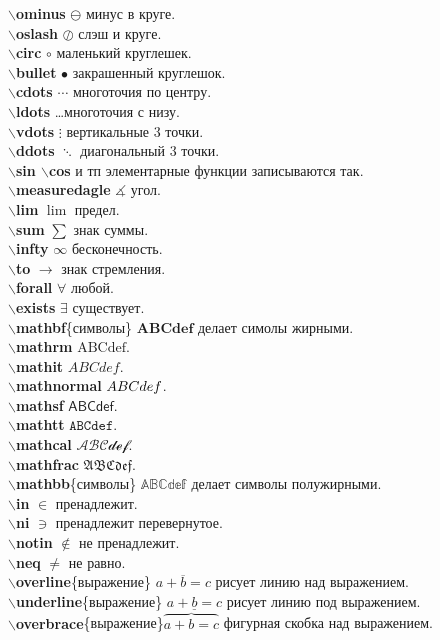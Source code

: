 \documentclass{article}
\newcommand{\bs}{$\backslash$}
\newcommand{\bd}[1]{{\bfseries #1}} %
\newcommand{\bb}[1]{\bd{\bs #1}} %
\begin{document}
\bb{ominus} $\ominus$ минус в круге.\\
\bb{oslash} $\oslash$ слэш и круге.\\
\bb{circ} $\circ$ маленький круглешек.\\
\bb{bullet} $\bullet$ закрашенный круглешок.\\
\bb{cdots} $\cdots$ многоточия по центру.\\
\bb{ldots} \ldots многоточия с низу.\\
\bb{vdots} $\vdots$ вертикальные 3 точки.\\
\bb{ddots} $\ddots$ диагональный 3 точки.\\
\bb{sin \bs cos} и тп элементарные функции записываются так.\\
\bb{measuredagle} $\measuredangle$ угол.\\
\bb{lim} $\lim$ предел.\\
\bb{sum} $\sum$ знак суммы.\\
\bb{infty} $\infty$ бесконечность.\\
\bb{to} $\to$ знак стремления.\\
\bb{forall} $\forall$ любой.\\
\bb{exists} $\exists$ существует.\\
\bb{mathbf}\{символы\} $\mathbf{ABCdef}$ делает симолы жирными.\\
\bb{mathrm} $\mathrm{ABCdef}$.\\
\bb{mathit} $\mathit{ABCdef}$.\\
\bb{mathnormal} $\mathnormal{ABCdef}$.\\
\bb{mathsf} $\mathsf{ABCdef}$.\\
\bb{mathtt} $\mathtt{ABCdef}$.\\
\bb{mathcal} $\mathcal{ABCdef}$.\\
\bb{mathfrac} $\mathfrak{ABCdef}$.\\
\bb{mathbb}\{символы\} $\mathbb{ABCdef}$ делает символы полужирными.\\
\bb{in} $\in$ пренадлежит.\\
\bb{ni} $\ni$ пренадлежит перевернутое.\\
\bb{notin} $\notin$ не пренадлежит.\\
\bb{neq} $\neq$ не равно.\\
\bb{overline}\{выражение\} $\overline{a+b=c}$ рисует линию над выражением.\\
\bb{underline}\{выражение\} $\underline{a+b=c}$ рисует линию под выражением.\\
\bb{overbrace}\{выражение\}$\overbrace{a+b=c}$ фигурная скобка над выражением.\\
\end{document}
